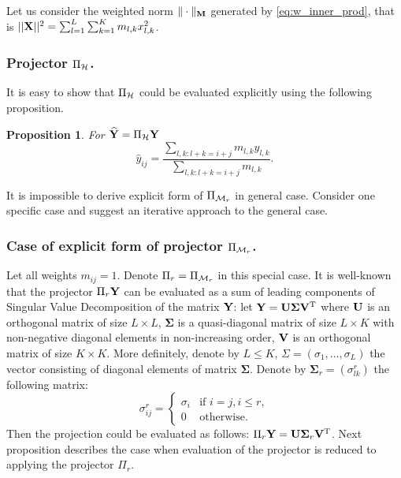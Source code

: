 \documentclass[sii]{ipart}
\newtheorem{proposition}{Proposition}
\begin{document}
Let us consider the weighted norm $\|\cdot\|_{\mathbf{M}}$ generated by \eqref{eq:w_inner_prod}, that is $||\mathbf{X}||^2 = \sum_{l = 1}^L \sum_{k = 1}^K m_{l, k} x^2_{l, k}$.

\subsubsection{Projector $\Pi_{\mathcal{H}}$.} It is easy to show that $\Pi_{\mathcal{H}}$
could be evaluated explicitly using the following proposition.

\begin{proposition}
	For $\widehat{\mathbf{Y}}=\Pi_{\mathcal{H}} \mathbf{Y}$
	\begin{equation*}
	\hat{y}_{ij} = \frac{\sum_{l,k: l+k=i+j} m_{l,k} y_{l,k}}{\sum_{l,k: l+k=i+j} m_{l,k}}.
	\end{equation*}
\end{proposition}

It is impossible to derive explicit form of $\Pi_{\mathcal{M}_r}$ in general case.
Consider one specific case and suggest an iterative approach to the general case.

\subsubsection{Case of explicit form of projector $\Pi_{\mathcal{M}_r}$.} 
Let all weights $m_{ij}=1$. Denote $\Pi_r=\Pi_{\mathcal{M}_r}$ in this special case.
It is well-known that the projector $\Pi_{r} \mathbf{Y}$ can be evaluated as a sum of leading components of Singular Value Decomposition of the matrix $\mathbf{Y}$: let $\mathbf{Y} = \mathbf{U} \mathbf{\Sigma} \mathbf{V}^{\mathrm{T}}$ where $\mathbf{U}$ is an orthogonal matrix of size $L \times L$, $\mathbf{\Sigma}$ is a quasi-diagonal matrix of size $L \times K$ with non-negative diagonal elements in non-increasing order, $\mathbf{V}$ is an orthogonal matrix of size $K \times K$. More definitely, denote by $L\le K$, $\Sigma = (\sigma_1, \ldots, \sigma_L)$ the vector consisting of diagonal elements of matrix $\mathbf{\Sigma}$. Denote by $\mathbf{\Sigma}_r = (\sigma^r_{l k})$ the following matrix:
\begin{equation*}
\sigma^r_{i j} = \begin{cases}
\sigma_i & \text{if $i = j, i \le r,$}\\
0 & \text{otherwise}.
\end{cases}
\end{equation*}
Then the projection could be evaluated as follows: $\Pi_{r} \mathbf{Y}  = \mathbf{U} \mathbf{\Sigma}_r \mathbf{V}^{\mathrm{T}}$.
Next proposition describes the case when evaluation of the projector is reduced to applying the projector  $\Pi_r$.
\end{document}
